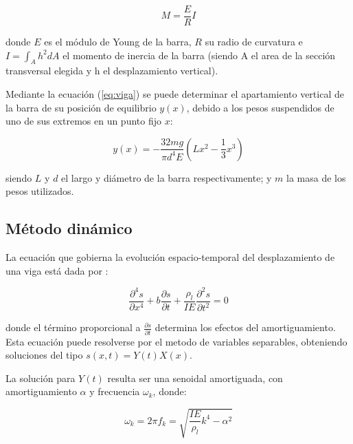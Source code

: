 \documentclass[twoside,twocolumn,a4paper]{article}
\begin{document}
\begin{equation}
\label{eq:viga}
M = \frac{E}{R}I
\end{equation}

donde $E$ es el m\'odulo de Young de la barra, $R$ su radio de curvatura e $I = \int_{A} h^2 dA$ el momento de inercia de la barra (siendo A el area de la secci\'on transversal elegida y h el desplazamiento vertical). \newline

Mediante la ecuaci\'on (\ref{eq:viga}) se puede determinar el apartamiento vertical de la barra de su posici\'on de equilibrio $y(x)$, debido a los pesos suspendidos de uno de sus extremos en un punto fijo $x$:

\begin{equation}
\label{eq:vigafeynman}
y(x) = -\frac{32mg}{\pi d^{4}E}(Lx^{2} - \frac{1}{3}x^{3})
\end{equation}

siendo $L$ y $d$ el largo y di\'ametro de la barra respectivamente; y $m$ la masa de los pesos utilizados.\newline


\subsection{M\'etodo din\'amico}

La ecuaci\'on que gobierna la evoluci\'on espacio-temporal del desplazamiento de una viga est\'a dada por \cite{eq:vigadyns}:

\begin{equation}
\label{eq:vigadyn}
\frac{\partial^4 s}{\partial x^4} + b\frac{\partial s}{\partial t} + \frac{\rho_{l}}{IE} \frac{\partial^2 s}{\partial t^2} = 0
\end{equation}

donde el t\'ermino proporcional a $\frac{\partial s}{\partial t}$ determina los efectos del amortiguamiento. Esta ecuaci\'on puede resolverse por el metodo de variables separables, obteniendo soluciones del tipo $s(x,t) = Y(t)X(x)$. \newline

La soluci\'on para $Y(t)$ resulta ser una senoidal amortiguada, con amortiguamiento $\alpha$ y frecuencia $\omega_{k}$, donde:

\begin{equation}
\label{eq:omegas}
\omega_{k} = 2\pi f_{k} = \sqrt{\frac{IE}{\rho_{l}}k^{4} - \alpha^2}
\end{equation}
\end{document}
